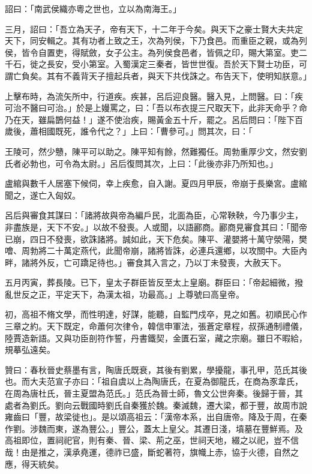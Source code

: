 \begin{pinyinscope}
詔曰：「南武侯織亦粵之世也，立以為南海王。」

三月，詔曰：「吾立為天子，帝有天下，十二年于今矣。與天下之豪士賢大夫共定天下，同安輯之。其有功者上致之王，次為列侯，下乃食邑。而重臣之親，或為列侯，皆令自置吏，得賦斂，女子公主。為列侯食邑者，皆佩之印，賜大第室。吏二千石，徙之長安，受小第室。入蜀漢定三秦者，皆世世復。吾於天下賢士功臣，可謂亡負矣。其有不義背天子擅起兵者，與天下共伐誅之。布告天下，使明知朕意。」

上擊布時，為流矢所中，行道疾。疾甚，呂后迎良醫。醫入見，上問醫。曰：「疾可治不醫曰可治。」於是上嫚罵之，曰：「吾以布衣提三尺取天下，此非天命乎？命乃在天，雖扁鵲何益！」遂不使治疾，賜黃金五十斤，罷之。呂后問曰：「陛下百歲後，蕭相國既死，誰令代之？」上曰：「曹參可。」問其次，曰：「

王陵可，然少戇，陳平可以助之。陳平知有餘，然難獨任。周勃重厚少文，然安劉氏者必勃也，可令為太尉。」呂后復問其次，上曰：「此後亦非乃所知也。」

盧綰與數千人居塞下候伺，幸上疾愈，自入謝。夏四月甲辰，帝崩于長樂宮。盧綰聞之，遂亡入匈奴。

呂后與審食其謀曰：「諸將故與帝為編戶民，北面為臣，心常鞅鞅，今乃事少主，非盡族是，天下不安。」以故不發喪。人或聞，以語酈商。酈商見審食其曰：「聞帝已崩，四日不發喪，欲誅諸將。誠如此，天下危矣。陳平、灌嬰將十萬守滎陽，樊噲、周勃將二十萬定燕代，此聞帝崩，諸將皆誅，必連兵還鄉，以攻關中。大臣內畔，諸將外反，亡可蹻足待也。」審食其入言之，乃以丁未發喪，大赦天下。

五月丙寅，葬長陵。已下，皇太子群臣皆反至太上皇廟。群臣曰：「帝起細微，撥亂世反之正，平定天下，為漢太祖，功最高。」上尊號曰高皇帝。

初，高祖不脩文學，而性明達，好謀，能聽，自監門戍卒，見之如舊。初順民心作三章之約。天下既定，命蕭何次律令，韓信申軍法，張蒼定章程，叔孫通制禮儀，陸賈造新語。又與功臣剖符作誓，丹書鐵契，金匱石室，藏之宗廟。雖日不暇給，規摹弘遠矣。

贊曰：春秋晉史蔡墨有言，陶唐氏既衰，其後有劉累，學擾龍，事孔甲，范氏其後也。而大夫范宣子亦曰：「祖自虞以上為陶唐氏，在夏為御龍氏，在商為豕韋氏，在周為唐杜氏，晉主夏盟為范氏。」范氏為晉士師，魯文公世奔秦。後歸于晉，其處者為劉氏。劉向云戰國時劉氏自秦獲於魏。秦滅魏，遷大梁，都于豐，故周巿說雍齒曰「豐，故梁徙也」。是以頌高祖云：「漢帝本系，出自唐帝。降及于周，在秦作劉。涉魏而東，遂為豐公。」豐公，蓋太上皇父。其遷日淺，墳墓在豐鮮焉。及高祖即位，置祠祀官，則有秦、晉、梁、荊之巫，世祠天地，綴之以祀，豈不信哉！由是推之，漢承堯運，德祚已盛，斷蛇著符，旗幟上赤，協于火德，自然之應，得天統矣。


\end{pinyinscope}